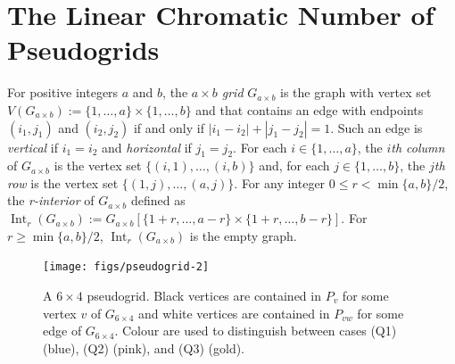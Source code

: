 \documentclass{patmorin}
\DeclareMathOperator{\interior}{Int}
\newcommand{\defin}[1]{\emph{\color{brightmaroon}#1}}
\begin{document}
\section{The Linear Chromatic Number of Pseudogrids}

For positive integers $a$ and $b$, the \defin{$a\times b$ grid} $G_{a\times b}$ is the graph with vertex set $V(G_{a\times b}):=\{1,\ldots,a\}\times\{1,\ldots,b\}$ and that contains an edge with endpoints $(i_1,j_1)$ and $(i_2,j_2)$ if and only if $|i_1-i_2|+|j_1-j_2|=1$.  Such an edge is \defin{vertical} if $i_1=i_2$ and \defin{horizontal} if $j_1=j_2$.  For each $i\in\{1,\ldots,a\}$, the \defin{$i$th column} of $G_{a\times b}$ is the vertex set $\{(i,1),\ldots,(i,b)\}$ and, for each $j\in\{1,\ldots,b\}$, the \defin{$j$th row} is the vertex set $\{(1,j),\ldots,(a,j)\}$.  For any integer $0\le r<\min\{a,b\}/2$, the \defin{r-interior} of $G_{a\times b}$ defined as $\interior_r(G_{a\times b}):=G_{a\times b}[\{1+r,\ldots,a-r\}\times\{1+r,\ldots,b-r\}]$.  For $r\ge\min\{a,b\}/2$, $\interior_r(G_{a\times b})$ is the empty graph.

\begin{figure}
  \begin{center}
    \texttt{[image: figs/pseudogrid-2]}
  \end{center}
  \caption{A $6\times 4$ pseudogrid.  Black vertices are contained in $P_v$ for some vertex $v$ of $G_{6\times 4}$ and white vertices are contained in $P_{vw}$ for some edge of $G_{6\times 4}$. Colour are used to distinguish between cases (Q1) (blue), (Q2) (pink), and (Q3) (gold).}
  \label{pseudogrid_fig}
\end{figure}
\end{document}
